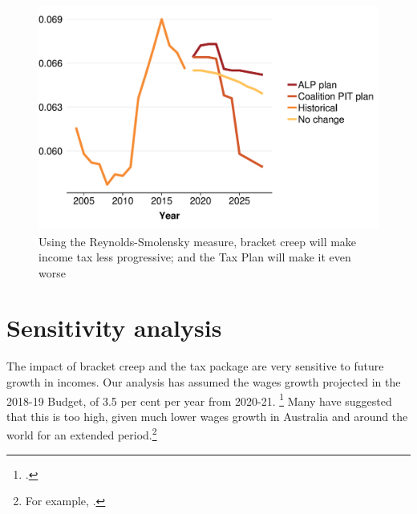 \documentclass[submission]{grattan}
\newenvironment{knitrout}{}{} %
\begin{document}
\begin{figure}
\caption{Using the Reynolds-Smolensky measure, bracket creep will make income tax less progressive; and the Tax Plan will make it even worse}\label{fig:progressivity}
\begin{knitrout}
\color{fgcolor}
\includegraphics[width=4.47222in,height=2.92631723826715in]{atlas/progressivities-1} 

\end{knitrout}
\end{figure}

\section{Sensitivity analysis}\label{sec:sensitivity-analysis}

The impact of bracket creep and the tax package are very sensitive to future growth in incomes. Our analysis has assumed the wages growth projected in the 2018-19 Budget, of 3.5 per cent per year from 2020-21.%
  \footcite[][1--10]{Treasury2018a}
Many have suggested that this is too high, given much lower wages growth in Australia and around the world for an extended period.\footnote{For example, \textcite{Knaus}.}
\end{document}
